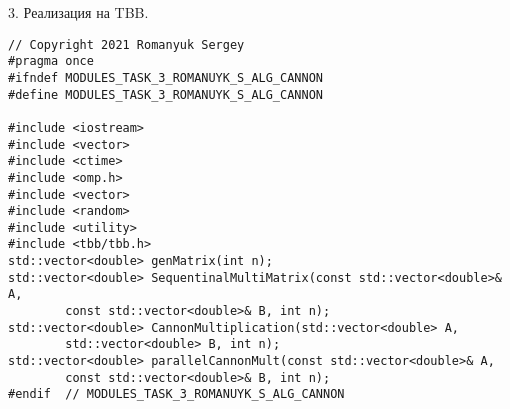 \documentclass{report}
\begin{document}
\par 3. Реализация на TBB.
\begin{lstlisting}
// Copyright 2021 Romanyuk Sergey
#pragma once
#ifndef MODULES_TASK_3_ROMANUYK_S_ALG_CANNON
#define MODULES_TASK_3_ROMANUYK_S_ALG_CANNON

#include <iostream>
#include <vector>
#include <ctime>
#include <omp.h>
#include <vector>
#include <random>
#include <utility>
#include <tbb/tbb.h>
std::vector<double> genMatrix(int n);
std::vector<double> SequentinalMultiMatrix(const std::vector<double>& A,
        const std::vector<double>& B, int n);
std::vector<double> CannonMultiplication(std::vector<double> A,
        std::vector<double> B, int n);
std::vector<double> parallelCannonMult(const std::vector<double>& A,
        const std::vector<double>& B, int n);
#endif  // MODULES_TASK_3_ROMANUYK_S_ALG_CANNON

\end{lstlisting}
\end{document}

